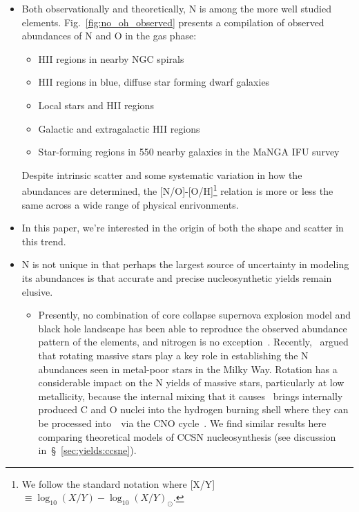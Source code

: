 \documentclass[ms.tex]{subfiles}
\begin{document}
\begin{itemize} 
	\item Both observationally and theoretically, N is among the more well 
	studied elements. 
	Fig.~\ref{fig:no_oh_observed} presents a compilation of observed abundances 
	of N and O in the gas phase: 
	\begin{itemize} 
		\item HII regions in nearby NGC spirals~\citep{Pilyugin2010} 

		\item HII regions in blue, diffuse star forming dwarf 
		galaxies~\citep{Berg2012, Izotov2012, James2015} 

		\item Local stars and HII regions~\citep{Dopita2016} 

		\item Galactic and extragalactic HII regions~\citep{Henry2000} 

		\item Star-forming regions in 550 nearby galaxies in the MaNGA IFU 
		survey~\citep{Belfiore2017} 
	\end{itemize} 
	Despite intrinsic scatter and some systematic variation in how the 
	abundances are determined, the [N/O]-[O/H]\footnote{
		We follow the standard notation where 
		[X/Y]~$\equiv \log_{10}(X/Y) - \log_{10}(X/Y)_\odot$. 
	} relation is more or less the same across a wide range of physical 
	enrivonments. 

	\item In this paper, we're interested in the origin of both the shape and 
	scatter in this trend. 

	\item N is not unique in that perhaps the largest source of uncertainty in 
	modeling its abundances is that accurate and precise nucleosynthetic yields 
	remain elusive. 
	\begin{itemize} 
		\item Presently, no combination of core collapse supernova explosion 
		model and black hole landscape has been able to reproduce the observed 
		abundance pattern of the elements, and nitrogen is no 
		exception~\citep{Griffith2021}. 
		Recently,~\citet*{Grisoni2021} argued that rotating massive stars play 
		a key role in establishing the N abundances seen in metal-poor stars in 
		the Milky Way. 
		Rotation has a considerable impact on the N yields of massive stars, 
		particularly at low metallicity, because the internal mixing that it 
		causes~\citep{Zahn1992, Maeder1998, Lagarde2012} brings internally 
		produced C and O nuclei into the hydrogen burning shell where they can 
		be processed into~\Nfourteen~via the CNO cycle~\citep{Heger2010, 
		Frischknecht2016, Andrews2017}. 
		We find similar results here comparing theoretical models of CCSN 
		nucleosynthesis (see discussion in~\S~\ref{sec:yields:ccsne}). 
	

\end{itemize}
\end{itemize}
\end{document}
